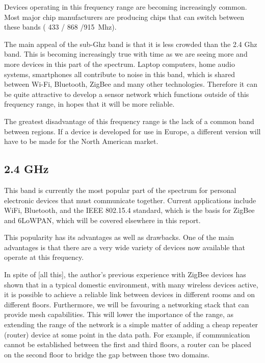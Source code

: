 Devices operating in this frequency range are becoming increasingly common. Most
major chip manufacturers are producing chips that can switch between these bands
( 433 / 868 /\SI{915}{Mhz}).

The main appeal of the sub-Ghz band is that it is less crowded than the 2.4 Ghz
band. This is becoming increasingly true with time as we are seeing more and
more devices in this part of the spectrum. Laptop computers, home audio systems,
smartphones all contribute to noise in this band, which is shared between Wi-Fi,
Bluetooth, ZigBee and many other technologies. Therefore it can be quite
attractive to develop a sensor network which functions outside of this frequency
range, in hopes that it will be more reliable.

The greatest disadvantage of this frequency range is the lack of a common band
between regions. If a device is developed for use in Europe, a different version
will have to be made for the North American market.

\subsection{2.4 GHz}

This band is currently the most popular part of the spectrum for personal
electronic devices that must communicate together. Current applications include
WiFi, Bluetooth, and the IEEE 802.15.4 standard, which is the basis for ZigBee
and \ac{6LoWPAN}, which will be covered elsewhere in this report.

This popularity has its advantages as well as drawbacks. One of the main
advantages is that there are a very wide variety of devices now available that
operate at this frequency. 


In spite of [all this], the author's previous experience with ZigBee devices has
shown that in a typical domestic environment, with many wireless devices active,
it is possible to achieve a reliable link between devices in different rooms and
on different floors. Furthermore, we will be favouring a networking stack that
can provide mesh capabilities. This will lower the importance of the range, as
extending the range of the network is a simple matter of adding a cheap repeater
(router) device at some point in the data path. For example, if communication
cannot be established between the first and third floors, a router can be placed
on the second floor to bridge the gap between those two domains.


